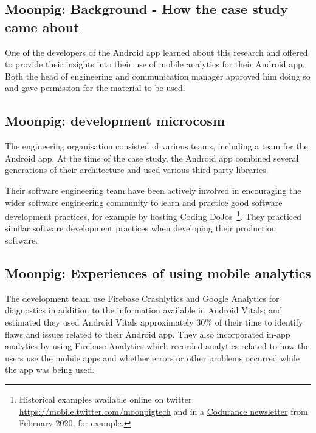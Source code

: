 \subsection{Moonpig: Background - How the case study came about}
One of the developers of the Android app learned about this research and offered to provide their insights into their use of mobile analytics for their Android app. Both the head of engineering and communication manager approved him doing so and gave permission for the material to be used.

\subsection{Moonpig: development microcosm}
The engineering organisation consisted of various teams, including a team for the Android app. At the time of the case study, the Android app combined several generations of their architecture and used various third-party libraries.

Their software engineering team have been actively involved in encouraging the wider software engineering community to learn and practice good software development practices, for example by hosting Coding DoJos~\footnote{Historical examples available online on twitter \url{https://mobile.twitter.com/moonpigtech} and in a \href{https://www.codurance.com/publications/newsletters/2020-02-13-newsletter}{Codurance newsletter} from February 2020, for example.}. They practiced similar software development practices when developing their production software.

\subsection{Moonpig: Experiences of using mobile analytics}
The development team use Firebase Crashlytics and Google Analytics for diagnostics in addition to the information available in Android Vitals; and estimated they used Android Vitals approximately 30\% of their time to identify flaws and issues related to their Android app.
%
They also incorporated in-app analytics by using Firebase Analytics which recorded analytics related to how the users use the mobile apps and whether errors or other problems occurred while the app was being used. 

